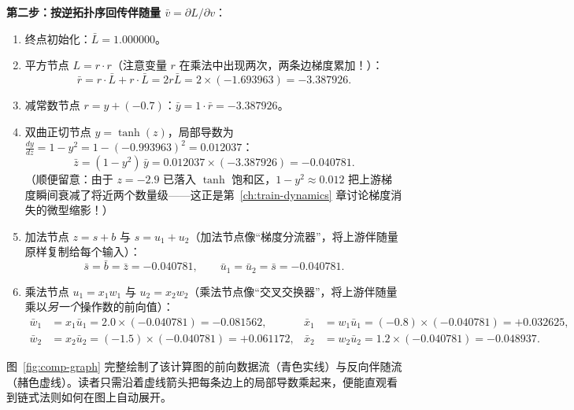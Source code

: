 \textbf{第二步：按逆拓扑序回传伴随量 $\bar{v} = \partial L / \partial v$}：
\begin{enumerate}
  \item 终点初始化：$\bar{L} = 1.000000$。
  \item 平方节点 $L = r \cdot r$（注意变量 $r$ 在乘法中出现两次，两条边梯度累加！）：
  \[
    \bar{r} = r \cdot \bar{L} + r \cdot \bar{L} = 2r \bar{L} = 2 \times (-1.693963) = -3.387926.
  \]
  \item 减常数节点 $r = y + (-0.7)$：$\bar{y} = 1 \cdot \bar{r} = -3.387926$。
  \item 双曲正切节点 $y = \tanh(z)$，局部导数为 $\frac{dy}{dz} = 1 - y^2 = 1 - (-0.993963)^2 = 0.012037$：
  \[
    \bar{z} = (1 - y^2)\,\bar{y} = 0.012037 \times (-3.387926) = -0.040781.
  \]
  （顺便留意：由于 $z = -2.9$ 已落入 $\tanh$ 饱和区，$1-y^2 \approx 0.012$ 把上游梯度瞬间衰减了将近两个数量级——这正是第~\ref{ch:train-dynamics} 章讨论梯度消失的微型缩影！）
  \item 加法节点 $z = s + b$ 与 $s = u_1 + u_2$（加法节点像“梯度分流器”，将上游伴随量原样复制给每个输入）：
  \[
    \bar{s} = \bar{b} = \bar{z} = -0.040781, \qquad \bar{u}_1 = \bar{u}_2 = \bar{s} = -0.040781.
  \]
  \item 乘法节点 $u_1 = x_1 w_1$ 与 $u_2 = x_2 w_2$（乘法节点像“交叉交换器”，将上游伴随量乘以\emph{另一个}操作数的前向值）：
  \begin{align*}
    \bar{w}_1 &= x_1 \bar{u}_1 = 2.0 \times (-0.040781) = -0.081562, &
    \bar{x}_1 &= w_1 \bar{u}_1 = (-0.8) \times (-0.040781) = +0.032625, \\
    \bar{w}_2 &= x_2 \bar{u}_2 = (-1.5) \times (-0.040781) = +0.061172, &
    \bar{x}_2 &= w_2 \bar{u}_2 = 1.2 \times (-0.040781) = -0.048937.
  \end{align*}
\end{enumerate}

图~\ref{fig:comp-graph} 完整绘制了该计算图的前向数据流（青色实线）与反向伴随流（赭色虚线）。读者只需沿着虚线箭头把每条边上的局部导数乘起来，便能直观看到链式法则如何在图上自动展开。

